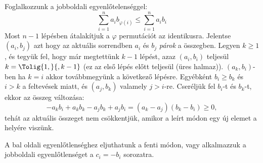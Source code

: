 Foglalkozzunk a jobboldali egyenlőtelenséggel:
$$
\sum_{i=1}^{n} a_{i}b_{\varphi(i)} \le \sum_{i=1}^{n} a_{i}b_{i}
$$
Most $n-1$ lépésben átalakítjuk a $\varphi$ permutációt az identikusra.
Jelentse $(a_{i},b_{j})$ azt hogy az aktuális sorrendben $a_{i}$ és 
$b_{j}$ {\it párok} a összegben. Legyen $k\ge 1$, és tegyük fel, 
hogy már megtettünk $k-1$ lépést, azaz $(a_{i},b_{i})$ 
teljesül $k=\Tolig{1,}{,k-1}$ (ez az első lépés előtt teljesül (üres halmaz)).
$(a_{k},b_{i})$-ben ha $k=i$ akkor továbbmegyünk a következő lépésre.
Egyébként $b_{i}\ge b_{k}$ és $i>k$ a feltevések miatt, és $(a_{j},b_{k})$ valamely $j>i$-re. 
Cseréljük fel $b_{i}$-t és $b_{k}$-t, ekkor az összeg változása:
$$
-a_{k}b_{i}+a_{k}b_{k} - a_{j}b_{k} + a_{j}b_{i}=
(a_{k}-a_{j})(b_{k} - b_{i}) \ge 0,
$$
tehát az aktuális összeget nem csökkentjük, amikor a leírt módon egy új 
elemet a helyére viszünk.
\par A bal oldali egyenlőtlenséghez eljuthatunk a fenti módon, vagy alkalmazzuk 
a jobboldali egyenlőtlenséget a $c_{i}=-b_{i}$ sorozatra.
